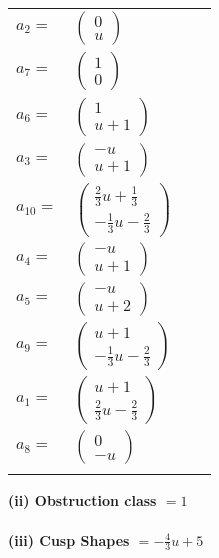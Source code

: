 \documentclass[1p]{elsarticle_modified}
\theoremstyle{definition}
\begin{document}
\begin{tabular}{m{7pt} m{180pt} m{7pt} m{180pt} }
\flushright $a_{2}=$&$\begin{pmatrix}0\\u\end{pmatrix}$ \\
\flushright $a_{7}=$&$\begin{pmatrix}1\\0\end{pmatrix}$ \\
\flushright $a_{6}=$&$\begin{pmatrix}1\\u+1\end{pmatrix}$ \\
\flushright $a_{3}=$&$\begin{pmatrix}- u\\u+1\end{pmatrix}$ \\
\flushright $a_{10}=$&$\begin{pmatrix}\frac{2}{3} u+\frac{1}{3}\\-\frac{1}{3} u-\frac{2}{3}\end{pmatrix}$ \\
\flushright $a_{4}=$&$\begin{pmatrix}- u\\u+1\end{pmatrix}$ \\
\flushright $a_{5}=$&$\begin{pmatrix}- u\\u+2\end{pmatrix}$ \\
\flushright $a_{9}=$&$\begin{pmatrix}u+1\\-\frac{1}{3} u-\frac{2}{3}\end{pmatrix}$ \\
\flushright $a_{1}=$&$\begin{pmatrix}u+1\\\frac{2}{3} u-\frac{2}{3}\end{pmatrix}$ \\
\flushright $a_{8}=$&$\begin{pmatrix}0\\- u\end{pmatrix}$\\&\end{tabular}
\flushleft \textbf{(ii) Obstruction class $= 1$}\\~\\
\flushleft \textbf{(iii) Cusp Shapes $= -\frac{4}{3} u+5$}\\~\\
\end{document}
